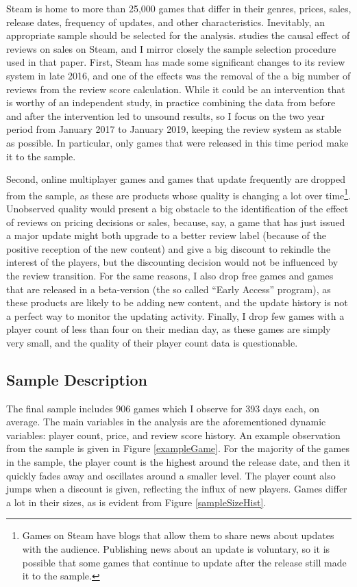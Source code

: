 \documentclass[12pt,pagebackref]{article}
\begin{document}
Steam is home to more than 25,000 games that differ in their genres,
prices, sales, release dates, frequency of updates, and other
characteristics. Inevitably, an appropriate sample should be selected
for the analysis. \citet{SorokinStevens20} studies the causal effect of
reviews on sales on Steam, and I mirror closely the sample selection
procedure used in that paper. First, Steam has made some significant
changes to its review system in late 2016, and one of the effects was
the removal of the a big number of reviews from the review score
calculation. While it could be an intervention that is worthy of an
independent study, in practice combining the data from before and after
the intervention led to unsound results, so I focus on the two year
period from January 2017 to January 2019, keeping the review system as
stable as possible. In particular, only games that were released in this
time period make it to the sample.

Second, online multiplayer games and games that update frequently are
dropped from the sample, as these are products whose quality is changing
a lot over
time\footnote{Games on Steam have blogs that allow them to share news about updates with the audience. Publishing news about an update is voluntary, so it is possible that some games that continue to update after the release still made it to the sample.}.
Unobserved quality would present a big obstacle to the identification of
the effect of reviews on pricing decisions or sales, because, say, a
game that has just issued a major update might both upgrade to a better
review label (because of the positive reception of the new content) and
give a big discount to rekindle the interest of the players, but the
discounting decision would not be influenced by the review transition.
For the same reasons, I also drop free games and games that are released
in a beta-version (the so called ``Early Access'' program), as these
products are likely to be adding new content, and the update history is
not a perfect way to monitor the updating activity. Finally, I drop few
games with a player count of less than four on their median day, as
these games are simply very small, and the quality of their player count
data is questionable.

\hypertarget{sample-description}{%
\subsection{Sample Description}\label{sample-description}}

The final sample includes 906 games which I observe for 393 days each,
on average. The main variables in the analysis are the aforementioned
dynamic variables: player count, price, and review score history. An
example observation from the sample is given in Figure
\ref{exampleGame}. For the majority of the games in the sample, the
player count is the highest around the release date, and then it quickly
fades away and oscillates around a smaller level. The player count also
jumps when a discount is given, reflecting the influx of new players.
Games differ a lot in their sizes, as is evident from Figure
\ref{sampleSizeHist}.
\end{document}
